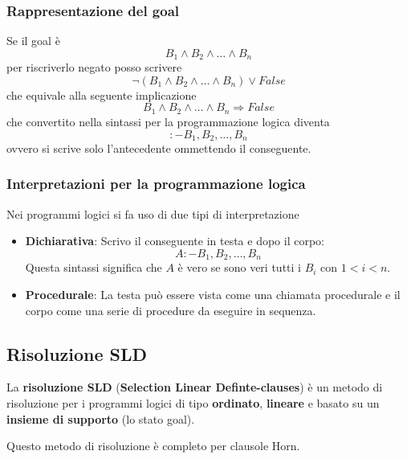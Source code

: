 \subsubsection{Rappresentazione del goal}
Se il goal \`e
\[ B_1 \wedge B_2 \wedge \dots \wedge B_n \]
per riscriverlo negato posso scrivere
\[ \lnot (B_1 \wedge B_2 \wedge \dots \wedge B_n) \vee False \]
che equivale alla seguente implicazione
\[ B_1 \wedge B_2 \wedge \dots \wedge B_n \Rightarrow False \]
che convertito nella sintassi per la programmazione logica diventa
\[ :- B_1, B_2, \dots, B_n \]
ovvero si scrive solo l'antecedente ommettendo il conseguente.

\subsubsection{Interpretazioni per la programmazione logica}
Nei programmi logici si fa uso di due tipi di interpretazione
\begin{itemize}
	\item \textbf{Dichiarativa}: Scrivo il conseguente in testa e dopo il corpo:
	      \[ A :- B_1, B_2, \dots, B_n \]
	      Questa sintassi significa che $A$ \`e vero se sono veri tutti i $B_i$ con $1 < i < n$.
	\item \textbf{Procedurale}: La testa pu\`o essere vista come una chiamata procedurale e il corpo come una
	      serie di procedure da eseguire in sequenza.
\end{itemize}

\subsection{Risoluzione SLD}
La \textbf{risoluzione SLD} (\textbf{Selection Linear Definte-clauses}) \`e un metodo di risoluzione per i programmi
logici di tipo \textbf{ordinato}, \textbf{lineare} e  basato su un \textbf{insieme di supporto} (lo stato goal).

Questo metodo di risoluzione \`e completo per clausole Horn.


